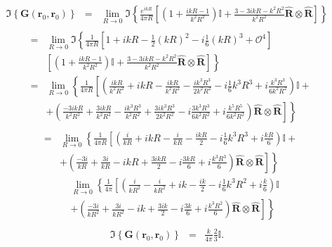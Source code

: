 \begin{eqnarray*}
\Im\left\{ \mathbf{G}\left(\mathbf{r}_{0},\mathbf{r}_{0}\right)\right\}  & = & \lim_{R \rightarrow 0 }\Im\left\{ \frac{e^{ikR}}{4\pi R}\left[\left(1+\frac{ikR-1}{k^{2}R^{2}}\right)\mathbb{I}+\frac{3-3ikR-k^{2}R^{2}}{k^{2}R^{2}}\hat{\mathbf{R}}\otimes \hat{\mathbf{R}}\right]\right\} \\
\end{eqnarray*}
\begin{eqnarray*}
 & = & \lim_{R \rightarrow 0 }\Im\left\{ \frac{1}{4\pi R}\left[1+ikR-\frac{1}{2}\left(kR\right)^{2}-i\frac{1}{6}\left(kR\right)^{3}+\mathcal{O}^{4}\right]\right. \\
 & & \left. \left[\left(1+\frac{ikR-1}{k^{2}R^{2}}\right)\mathbb{I}+\frac{3-3ikR-k^{2}R^{2}}{k^{2}R^{2}}\hat{\mathbf{R}}\otimes \hat{\mathbf{R}}\right]\right\} \\
 & = & \lim_{R \rightarrow 0 } \left\{\frac{1}{4\pi R}\left[\left(\frac{ikR}{k^{2}R^{2}}+ikR-\frac{ikR}{k^{2}R^{2}}-\frac{ik^{3}R^{3}}{2k^{2}R^{2}}-i\frac{1}{6}k^{3}R^{3}+i\frac{k^{3}R^{3}}{6k^{2}R^{2}}\right)\mathbb{I}+ \right. \right. \\
 & & \left. \left. + \left(\frac{-3ikR}{k^{2}R^{2}}+\frac{3ikR}{k^{2}R^{2}}-\frac{ik^{3}R^{3}}{k^{2}R^{2}}+\frac{3ik^{3}R^{3}}{2k^{2}R^{2}}-i\frac{3k^{3}R^{3}}{6k^{2}R^{2}}+i\frac{k^{5}R^{5}}{6k^{2}R^{2}}\right)\hat{\mathbf{R}}\otimes \hat{\mathbf{R}}\right]\right\}\\\end{eqnarray*}
\begin{eqnarray*}
 & = & \lim_{R \rightarrow 0 }\left\{\frac{1}{4\pi R}\left[\left(\frac{i}{kR}+ikR-\frac{i}{kR}-\frac{ikR}{2}-i\frac{1}{6}k^{3}R^{3}+i\frac{kR}{6}\right)\mathbb{I}+ \right. \right. \\
 & & \left. \left.+ \left(\frac{-3i}{kR}+\frac{3i}{kR}-ikR+\frac{3ikR}{2}-i\frac{3kR}{6}+i\frac{k^{3}R^{3}}{6}\right)\hat{\mathbf{R}}\otimes \hat{\mathbf{R}}\right]\right\}
\end{eqnarray*}
\begin{eqnarray*}
 &  & \lim_{R \rightarrow 0 }\left\{\frac{1}{4\pi}\left[\left(\frac{i}{kR^2}-\frac{i}{kR^2}+ik-\frac{ik}{2}-i\frac{1}{6}k^{3}R^{2}+i\frac{k}{6}\right)\mathbb{I}\right.\right. \\ 
 & & \left.\left. +\left(\frac{-3i}{kR^{2}}+\frac{3i}{kR^{2}}-ik+\frac{3ik}{2}-i\frac{3k}{6}+i\frac{k^{3}R^{2}}{6}\right)\hat{\mathbf{R}}\otimes \hat{\mathbf{R}}\right]\right\}\\
  \end{eqnarray*}
 \begin{eqnarray}
 \Im\left\{ \mathbf{G}\left(\mathbf{r}_{0},\mathbf{r}_{0}\right)\right\} & = & \frac{k}{4\pi}\frac{2}{3}\mathbb{I}.
\end{eqnarray}


